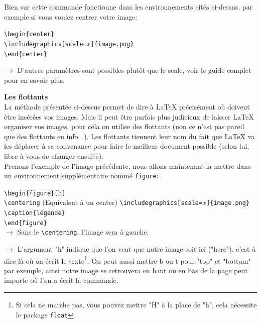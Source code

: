 \documentclass[11pt]{article}				%
\newcommand{\tb}{\textbackslash}
\newcommand{\cmdo}[3][]{\texttt{\textbackslash #2}\texttt{[#1}\texttt{]\{#3\}}}
\newcommand{\cmd}[2]{\texttt{\textbackslash #1}\texttt{\{#2\}}}
\begin{document}
Bien sur cette commande fonctionne dans les environnements cités ci-dessus, par exemple si vous voulez centrer votre image: \\


\begin{multicols}{2}
\cmd{begin}{center}\\
\cmdo[scale=$x$]{includegraphics}{image.png} \\
\cmd{end}{center}\\

\columnbreak

$\rightarrow$ D'autres paramètres sont possibles plutôt que le scale, voir le guide complet pour en savoir plus.
\end{multicols}


\textbf{Les flottants}\\

La méthode présentée ci-dessus permet de dire à LaTeX précisément où doivent être insérées vos images. Mais il peut être parfois plus judicieux de laisser LaTeX organiser vos images, pour cela on utilise des flottants (non ce n'est pas pareil que des flottants en info...). Les flottants tiennent leur nom du fait que LaTeX va les déplacer à sa convenance pour faire le meilleur document possible (selon lui, libre à vous de changer ensuite).\\



Prenons l'exemple de l'image précédente, nous allons maintenant la mettre dans un environnement supplémentaire nommé \texttt{figure}: \\

\begin{multicols}{2}
\cmd{begin}{figure}\texttt{[}h\texttt{]}\\
\texttt{\tb centering} \quad (Equivalent à un center)
\cmdo[scale=$x$]{includegraphics}{image.png} \\
\cmd{caption}{légende}\\
\cmd{end}{figure}\\
$\rightarrow$ Sans le \texttt{\tb centering}, l'image sera à gauche. 

\columnbreak

$\rightarrow$ L'argument "h" indique que l'on veut que notre image soit ici ("here"), c'est à dire là où on écrit le texte\footnote{Si cela ne marche pas, vous pouvez mettre "H" à la place de "h", cela nécessite le package \texttt{float}}. On peut aussi mettre b ou t pour "top" et "bottom" par exemple, ainsi notre image se retrouvera en haut ou en bas de la page peut importe où l'on a écrit la commande.
\end{multicols}
\end{document}
